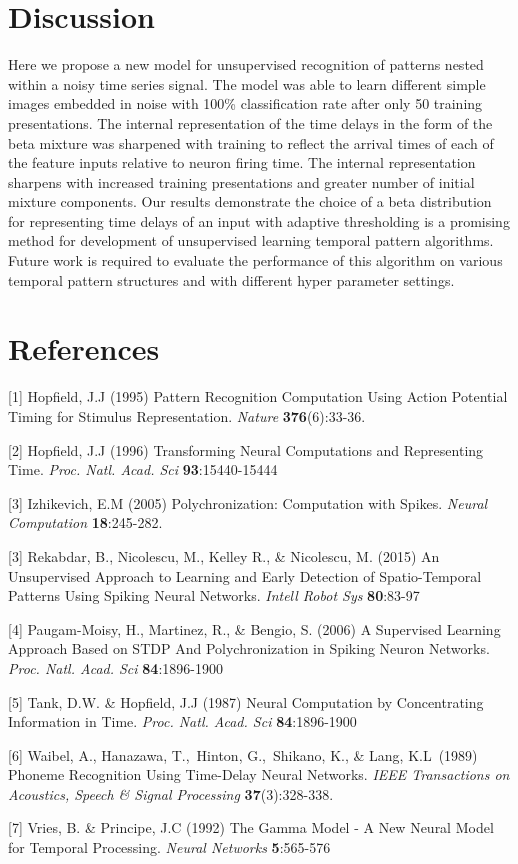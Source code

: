 \documentclass{article}
\begin{document}
\section*{Discussion}
Here we propose a new model for unsupervised recognition of patterns nested within a noisy time series signal.  The model was able to learn different simple images embedded in noise with 100\% classification rate after only 50 training presentations.  The internal representation of the time delays in the form of the beta mixture was sharpened with training to reflect the arrival times of each of the feature inputs relative to neuron firing time.  The internal representation sharpens with increased training presentations and greater number of initial mixture components. Our results demonstrate the choice of a beta distribution for representing time delays of an input with adaptive thresholding is a promising method for development of unsupervised learning temporal pattern algorithms.  Future work is required to evaluate the performance of this algorithm on various temporal pattern structures and with different hyper parameter settings. 
\section*{References}
\small
[1] Hopfield, J.J (1995) Pattern Recognition Computation Using Action Potential Timing for Stimulus Representation. {\it Nature} {\bf 376}(6):33-36.

[2] Hopfield, J.J (1996) Transforming Neural Computations and Representing Time. {\it Proc. Natl. Acad. Sci} {\bf 93}:15440-15444

[3] Izhikevich, E.M (2005) Polychronization: Computation with Spikes. {\it Neural Computation} {\bf 18}:245-282.

[3] Rekabdar, B., Nicolescu, M., Kelley R., \& Nicolescu, M. (2015) An Unsupervised Approach to Learning and Early Detection of Spatio-Temporal Patterns Using Spiking Neural Networks. {\it Intell Robot Sys} {\bf 80}:83-97

[4] Paugam-Moisy, H., Martinez, R., \& Bengio, S. (2006) A Supervised Learning Approach Based on STDP And Polychronization in Spiking Neuron Networks. {\it Proc. Natl. Acad. Sci} {\bf84}:1896-1900

[5] Tank, D.W. \& Hopfield, J.J (1987) Neural Computation by Concentrating Information in Time. {\it Proc. Natl. Acad. Sci} {\bf84}:1896-1900

[6] Waibel, A., Hanazawa, T.,\ Hinton, G.,\ Shikano, K., \& Lang, K.L\ (1989) Phoneme Recognition Using Time-Delay Neural Networks. {\it IEEE Transactions on Acoustics, Speech \& Signal Processing} {\bf 37}(3):328-338.

[7] Vries, B. \& Principe, J.C (1992) The Gamma Model - A New Neural Model for Temporal Processing. {\it Neural Networks} {\bf5}:565-576
\end{document}
